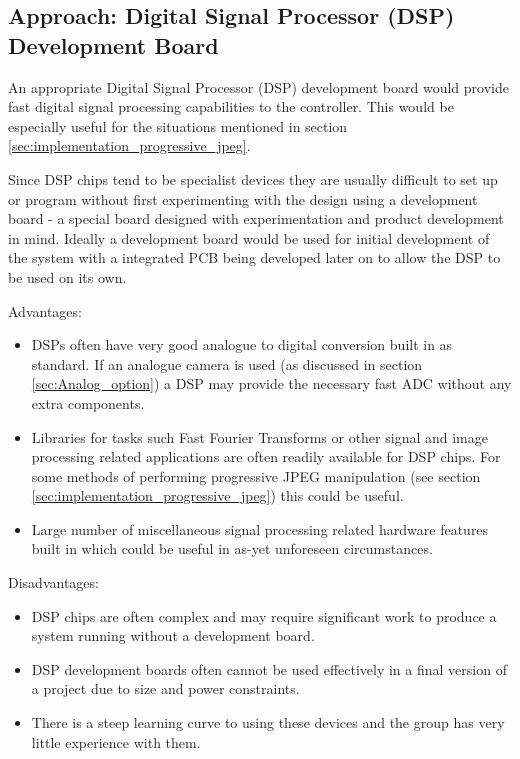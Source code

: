 \subsection{Approach: Digital Signal Processor (DSP) Development Board}
An appropriate Digital Signal Processor (DSP) development board would provide fast digital signal processing capabilities to the controller. This would be especially useful for the situations mentioned in section \ref{sec:implementation_progressive_jpeg}.

Since DSP chips tend to be specialist devices they are usually difficult to set up or program without first experimenting with the design using a development board - a special board designed with experimentation and product development in mind. Ideally a development board would be used for initial development of the system with a integrated PCB being developed later on to allow the DSP to be used on its own.

Advantages:
\begin{itemize}
\item DSPs often have very good analogue to digital conversion built in as standard. If an analogue camera is used (as discussed in section \ref{sec:Analog_option}) a DSP may provide the necessary fast ADC without any extra components.

\item Libraries for tasks such Fast Fourier Transforms or other signal and image processing related applications are often readily available for DSP chips. For some methods of performing progressive JPEG manipulation (see section \ref{sec:implementation_progressive_jpeg}) this could be useful.

\item Large number of miscellaneous signal processing related hardware features built in which could be useful in as-yet unforeseen circumstances.
\end{itemize}

Disadvantages:
\begin{itemize}
\item DSP chips are often complex and may require significant work to produce a system running without a development board.

\item DSP development boards often cannot be used effectively in a final version of a project due to size and power constraints.

\item There is a steep learning curve to using these devices and the group has very little experience with them.
\end{itemize}


